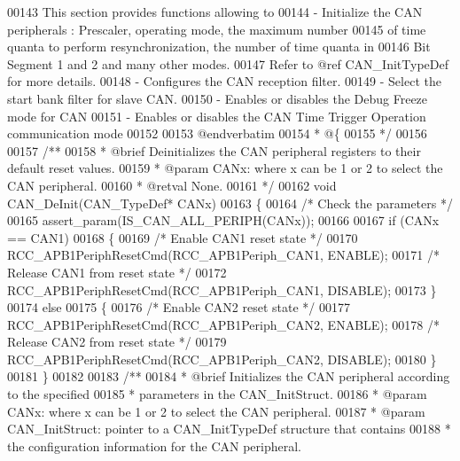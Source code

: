 \begin{DoxyCode}
00143 \textcolor{comment}{  This section provides functions allowing to }
00144 \textcolor{comment}{   - Initialize the CAN peripherals : Prescaler, operating mode, the maximum number }
00145 \textcolor{comment}{     of time quanta to perform resynchronization, the number of time quanta in}
00146 \textcolor{comment}{     Bit Segment 1 and 2 and many other modes. }
00147 \textcolor{comment}{     Refer to  @ref CAN\_InitTypeDef  for more details.}
00148 \textcolor{comment}{   - Configures the CAN reception filter.                                      }
00149 \textcolor{comment}{   - Select the start bank filter for slave CAN.}
00150 \textcolor{comment}{   - Enables or disables the Debug Freeze mode for CAN}
00151 \textcolor{comment}{   - Enables or disables the CAN Time Trigger Operation communication mode}
00152 \textcolor{comment}{   }
00153 \textcolor{comment}{@endverbatim}
00154 \textcolor{comment}{  * @\{}
00155 \textcolor{comment}{  */}
00156 
00157 \textcolor{comment}{/**}
00158 \textcolor{comment}{  * @brief  Deinitializes the CAN peripheral registers to their default reset values.}
00159 \textcolor{comment}{  * @param  CANx: where x can be 1 or 2 to select the CAN peripheral.}
00160 \textcolor{comment}{  * @retval None.}
00161 \textcolor{comment}{  */}
00162 \textcolor{keywordtype}{void} CAN_DeInit(CAN\_TypeDef* CANx)
00163 \{
00164   \textcolor{comment}{/* Check the parameters */}
00165   assert_param(IS\_CAN\_ALL\_PERIPH(CANx));
00166 
00167   \textcolor{keywordflow}{if} (CANx == CAN1)
00168   \{
00169     \textcolor{comment}{/* Enable CAN1 reset state */}
00170     RCC_APB1PeriphResetCmd(RCC_APB1Periph_CAN1, ENABLE);
00171     \textcolor{comment}{/* Release CAN1 from reset state */}
00172     RCC_APB1PeriphResetCmd(RCC_APB1Periph_CAN1, DISABLE);
00173   \}
00174   \textcolor{keywordflow}{else}
00175   \{
00176     \textcolor{comment}{/* Enable CAN2 reset state */}
00177     RCC_APB1PeriphResetCmd(RCC_APB1Periph_CAN2, ENABLE);
00178     \textcolor{comment}{/* Release CAN2 from reset state */}
00179     RCC_APB1PeriphResetCmd(RCC_APB1Periph_CAN2, DISABLE);
00180   \}
00181 \}
00182 
00183 \textcolor{comment}{/**}
00184 \textcolor{comment}{  * @brief  Initializes the CAN peripheral according to the specified}
00185 \textcolor{comment}{  *         parameters in the CAN\_InitStruct.}
00186 \textcolor{comment}{  * @param  CANx: where x can be 1 or 2 to select the CAN peripheral.}
00187 \textcolor{comment}{  * @param  CAN\_InitStruct: pointer to a CAN\_InitTypeDef structure that contains}
00188 \textcolor{comment}{  *         the configuration information for the CAN peripheral.}

\end{DoxyCode}
